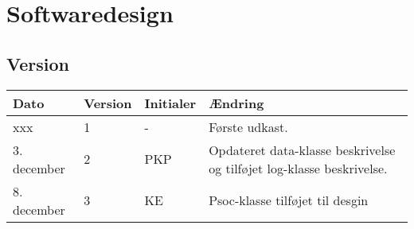\chapter{Softwaredesign}

\section*{Version}
\begin{table}[h]
	\centering
	\begin{tabularx}{\textwidth - 2cm}{|l|l|l|X|}
	\hline
	Dato			& Version		& Initialer 	& Ændring			\\ \hline
	xxx 			& 1 			& -				& Første udkast. 	\\ \hline
	3. december 	& 2 			& PKP			& Opdateret data-klasse beskrivelse og tilføjet log-klasse beskrivelse. 	\\ \hline
	8. december 	& 3 			& KE			& Psoc-klasse tilføjet til desgin 											\\ \hline
	\end{tabularx}
\end{table}
\clearpage



